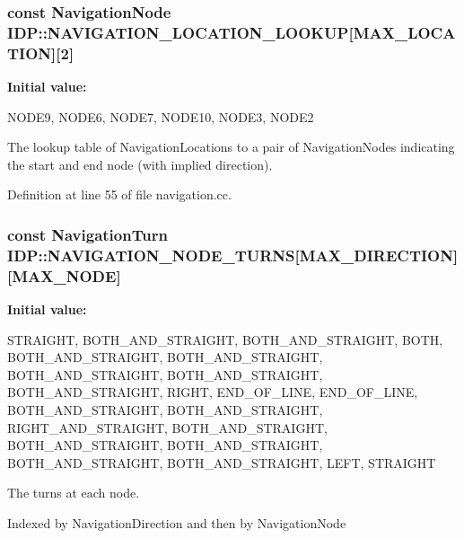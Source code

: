 \hypertarget{namespaceIDP_a33e1b72d66088b211bfeb61b18d7b63b}{
\subsubsection[{NAVIGATION\_\-LOCATION\_\-LOOKUP}]{\setlength{\rightskip}{0pt plus 5cm}const {\bf NavigationNode} {\bf IDP::NAVIGATION\_\-LOCATION\_\-LOOKUP}\mbox{[}MAX\_\-LOCATION\mbox{]}\mbox{[}2\mbox{]}}}
\label{namespaceIDP_a33e1b72d66088b211bfeb61b18d7b63b}
{\bfseries Initial value:}
\begin{DoxyCode}
 {
        {NODE9, NODE6}, 
        {NODE7, NODE10},
        {NODE3, NODE2}  
    }
\end{DoxyCode}


The lookup table of NavigationLocations to a pair of NavigationNodes indicating the start and end node (with implied direction). 



Definition at line 55 of file navigation.cc.

\hypertarget{namespaceIDP_aa117cb76acf18e6af22830d5f2468ff4}{
\subsubsection[{NAVIGATION\_\-NODE\_\-TURNS}]{\setlength{\rightskip}{0pt plus 5cm}const {\bf NavigationTurn} {\bf IDP::NAVIGATION\_\-NODE\_\-TURNS}\mbox{[}MAX\_\-DIRECTION\mbox{]}\mbox{[}MAX\_\-NODE\mbox{]}}}
\label{namespaceIDP_aa117cb76acf18e6af22830d5f2468ff4}
{\bfseries Initial value:}
\begin{DoxyCode}
 {
        {STRAIGHT, BOTH_AND_STRAIGHT, BOTH_AND_STRAIGHT, BOTH,
            BOTH_AND_STRAIGHT, BOTH_AND_STRAIGHT, BOTH_AND_STRAIGHT,
            BOTH_AND_STRAIGHT, BOTH_AND_STRAIGHT, RIGHT, END_OF_LINE},
        {END_OF_LINE, BOTH_AND_STRAIGHT, BOTH_AND_STRAIGHT, RIGHT_AND_STRAIGHT,
            BOTH_AND_STRAIGHT, BOTH_AND_STRAIGHT, BOTH_AND_STRAIGHT,
            BOTH_AND_STRAIGHT, BOTH_AND_STRAIGHT, LEFT, STRAIGHT}
    }
\end{DoxyCode}


The turns at each node. 

Indexed by NavigationDirection and then by NavigationNode 

